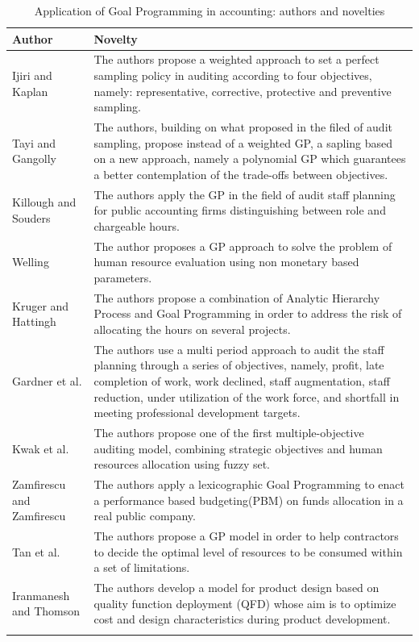 \begin{doublespace}
\begin{center}
\begin{longtable}{ || m{11em} m{20em}|| }
 \hline
 Author & Novelty \\ 
\hline\hline
Ijiri and Kaplan\cite{Ijiri1971} & The authors propose a weighted approach to set a perfect sampling policy in auditing according to four objectives, namely: representative, corrective, protective and preventive sampling. \\
\hline
Tayi and Gangolly\cite{Tayi1985} & The authors, building on what proposed in the filed of audit sampling, propose instead of a weighted GP, a sapling based on a new approach, namely a polynomial GP which guarantees a better contemplation of the trade-offs between objectives. \\
\hline
Killough and Souders\cite{Killough1973} & The authors apply the GP in the field of audit staff planning for public accounting firms distinguishing between role and chargeable hours. \\
\hline
Welling\cite{Welling1977} & The author proposes a GP approach to solve the problem of human resource evaluation using non monetary based parameters. \\
\hline
Kruger and Hattingh\cite{Kruger2006} & The authors propose a combination of Analytic Hierarchy Process and Goal Programming in order to address the risk of allocating the hours on several projects. \\
\hline
Gardner et al.\cite{Gardner1990} & The authors use a multi period approach to audit the staff planning through a series of objectives, namely, profit, late completion of work, work declined, staff augmentation, staff reduction, under utilization of the work force, and shortfall in meeting professional development targets. \\
\hline
Kwak et al.\cite{Kwak2003} & The authors propose one of the first multiple-objective auditing model, combining strategic objectives and human resources allocation using fuzzy set. \\
\hline
Zamfirescu and Zamfirescu\cite{Zamfirescu2013} & The authors apply a lexicographic Goal Programming to enact a performance based budgeting(PBM) on funds allocation in a real public company. \\
\w
Tan et al.\cite{Tan2008} & The authors propose a GP model in order to help contractors to decide the optimal level of resources to be consumed within a set of limitations.  \\
\hline 
Iranmanesh and Thomson\cite{Iranmanesh2008} & The authors develop a model for product design based
on quality function deployment (QFD) whose aim is to optimize cost and design characteristics during product
development. \\
 \hline
 \caption{Application of Goal Programming in accounting: authors and novelties}
 \end{longtable}
\end{center}


\end{doublespace}
